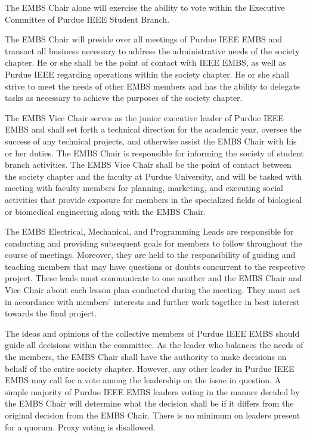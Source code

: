 \documentclass[12pt]{constitution}
\begin{document}
The EMBS Chair alone will exercise the ability to vote within the Executive Committee of Purdue IEEE Student Branch.

The EMBS Chair will preside over all meetings of Purdue IEEE EMBS and transact all business necessary to address the administrative needs of the society chapter. He or she shall be the point of contact with IEEE EMBS, as well as Purdue IEEE regarding operations within the society chapter. He or she shall strive to meet the needs of other EMBS members and has the ability to delegate tasks as necessary to achieve the purposes of the society chapter.

The EMBS Vice Chair serves as the junior executive leader of Purdue IEEE EMBS and shall set forth a technical direction for the academic year, oversee the success of any technical projects, and otherwise assist the EMBS Chair with his or her duties. The EMBS Chair is responsible for informing the society of student branch activities.  The EMBS Vice Chair shall be the point of contact between the society chapter and the faculty at Purdue University, and will be tasked with meeting with faculty members for planning, marketing, and executing social activities that provide exposure for members in the specialized fields of biological or biomedical engineering along with the EMBS Chair.

The EMBS Electrical, Mechanical, and Programming Leads are responsible for conducting and providing subsequent goals for members to follow throughout the course of meetings. Moreover, they are held to the responsibility of guiding and teaching members that may have questions or doubts concurrent to the respective project. These leads must communicate to one another and the EMBS Chair and Vice Chair about each lesson plan conducted during the meeting. They must act in accordance with members’ interests and further work together in best interest towards the final project.

\label{art:decide}

The ideas and opinions of the collective members of Purdue IEEE EMBS should guide all decisions within the committee. As the leader who balances the needs of the members, the EMBS Chair shall have the authority to make decisions on behalf of the entire society chapter. However, any other leader in Purdue IEEE EMBS may call for a vote among the leadership on the issue in question. A simple majority of Purdue IEEE EMBS leaders voting in the manner decided by the EMBS Chair will determine what the decision shall be if it differs from the original decision from the EMBS Chair. There is no minimum on leaders present for a quorum. Proxy voting is disallowed.
\end{document}
